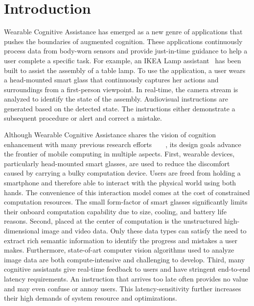 \chapter{Introduction}

Wearable Cognitive Assistance has emerged as a new genre of applications that
pushes the boundaries of augmented cognition. These applications continuously
process data from body-worn sensors and provide just-in-time guidance to help a
user complete a specific task. For example, an IKEA Lamp
assistant~\cite{chen2018application} has been built to assist the assembly of a
table lamp. To use the application, a user wears a head-mounted smart glass that
continuously captures her actions and surroundings from a first-person
viewpoint. In real-time, the camera stream is analyzed to identify the state of
the assembly. Audiovisual instructions are generated based on the detected
state. The instructions either demonstrate a subsequent procedure or alert and
correct a mistake.

Although Wearable Cognitive Assistance shares the vision of cognition
enhancement with many previous research
efforts~\cite{kidd1999aware}~\cite{loomis1998navigation}~\cite{cheverst2000developing}~\cite{tanuwidjaja2014chroma},
its design goals advance the frontier of mobile computing in multiple aspects.
First, wearable devices, particularly head-mounted smart glasses, are used to
reduce the discomfort caused by carrying a bulky computation device. Users are
freed from holding a smartphone and therefore able to interact with the physical
world using both hands. The convenience of this interaction model comes at the
cost of constrained computation resources. The small form-factor of smart
glasses significantly limits their onboard computation capability due to size,
cooling, and battery life reasons. Second, placed at the center of computation
is the unstructured high-dimensional image and video data. Only these data types
can satisfy the need to extract rich semantic information to identify
the progress and mistakes a user makes. Furthermore, state-of-art computer vision
algorithms used to analyze image data are both compute-intensive and challenging
to develop. Third, many cognitive assistants give real-time feedback to users
and have stringent end-to-end latency requirements. An instruction that arrives
too late often provides no value and may even confuse or annoy users. This
latency-sensitivity further increases their high demands of system resource and
optimizations.

